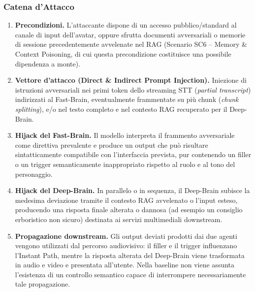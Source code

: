 \documentclass[11pt,a4paper]{article}
\begin{document}
\subsubsection{Catena d'Attacco}

\begin{enumerate}
    \item \textbf{Precondizioni.} L'attaccante dispone di un accesso pubblico/standard al canale di
    input dell'avatar, oppure sfrutta documenti avversariali o memorie di sessione precedentemente
    avvelenate nel RAG (Scenario SC6 -- Memory \& Context Poisoning, di
    cui questa precondizione costituisce una possibile dipendenza a monte).

    \item \textbf{Vettore d'attacco (Direct \& Indirect Prompt Injection).} Iniezione di istruzioni
    avversariali nei primi token dello streaming STT (\emph{partial transcript}) indirizzati al
    Fast-Brain, eventualmente frammentate su più chunk (\emph{chunk splitting}), e/o nel testo
    completo e nel contesto RAG recuperato per il Deep-Brain.

    \item \textbf{Hijack del Fast-Brain.} Il modello interpreta il frammento avversariale come
    direttiva prevalente e produce un output che può risultare
    sintatticamente compatibile con l'interfaccia prevista, pur contenendo
    un filler o un trigger semanticamente inappropriato rispetto al ruolo
    e al tono del personaggio.

    \item \textbf{Hijack del Deep-Brain.} In parallelo o in sequenza, il Deep-Brain subisce la
    medesima deviazione tramite il contesto RAG avvelenato o l'input esteso, producendo una risposta
    finale alterata o dannosa (ad esempio un consiglio erboristico non sicuro) destinata ai servizi
    multimediali downstream.

    \item \textbf{Propagazione downstream.}
    Gli output deviati prodotti dai due agenti vengono utilizzati dal
    percorso audiovisivo: il filler e il trigger influenzano l'Instant
    Path, mentre la risposta alterata del Deep-Brain viene trasformata in
    audio e video e presentata all'utente. Nella baseline non viene assunta
    l'esistenza di un controllo semantico capace di interrompere
    necessariamente tale propagazione.
\end{enumerate}

\end{document}
